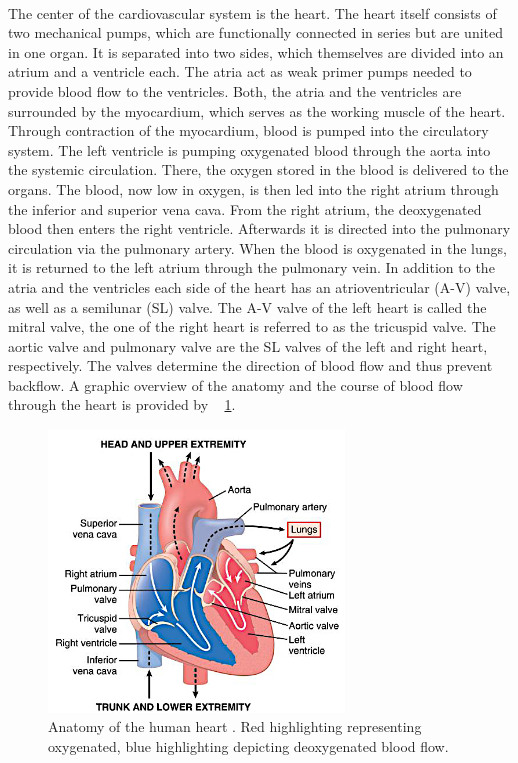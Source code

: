  \\The center of the cardiovascular system is the heart. The heart itself consists of two mechanical pumps, which are functionally connected in series but are united in one organ. It is separated into two sides, which themselves are divided into an atrium and a ventricle each. The atria act as weak primer pumps needed to provide blood flow to the ventricles. \cite{HKS4} Both, the atria and the ventricles are surrounded by the myocardium, which serves as the working muscle of the heart. Through contraction of the myocardium, blood is pumped into the circulatory system. \cite{HKS7} The left ventricle is pumping oxygenated blood through the aorta into the systemic circulation. There, the oxygen stored in the blood is delivered to the organs. The blood, now low in oxygen, is then led into the right atrium through the inferior and superior vena cava. From the right atrium, the deoxygenated blood then enters the right ventricle. Afterwards it is directed into the pulmonary circulation via the pulmonary artery. When the blood is oxygenated in the lungs, it is returned to the left atrium through the pulmonary vein. \cite{HKS4} In addition to the atria and the ventricles each side of the heart has an atrioventricular (A-V) valve, as well as a semilunar (SL) valve. The A-V valve of the left heart is called the mitral valve, the one of the right heart is referred to as the tricuspid valve. The aortic valve and pulmonary valve are the SL valves of the left and right heart, respectively. The valves determine the direction of blood flow and thus prevent backflow. \cite{HKS7} A graphic overview of the anatomy and the course of blood flow through the heart is provided by \figurename~ \ref{fig:heart_anat}.
 \begin{figure}[h]
   \centering
   \includegraphics[width=0.7\textwidth]{images/heart_1.jpg}
   \caption[Anatomy of the human heart \cite{GH20}]{Anatomy of the human heart \cite{GH20}. Red highlighting representing oxygenated, blue highlighting depicting deoxygenated blood flow.}
   \label{fig:heart_anat}
 \end{figure}

